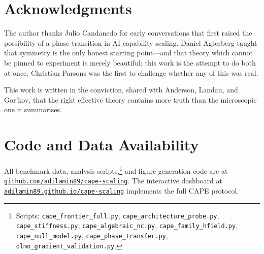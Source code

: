 \documentclass[11pt]{article}
\begin{document}
\section*{Acknowledgments}

The author thanks Julio Candanedo for early conversations that first raised the possibility of a phase transition in AI capability scaling.
Daniel Agterberg taught that symmetry is the only honest starting point---and that theory which cannot be pinned to experiment is merely beautiful; this work is the attempt to do both at once.
Christian Parsons was the first to challenge whether any of this was real.

This work is written in the conviction, shared with Anderson, Landau, and Gor'kov, that the right effective theory contains more truth than the microscopic one it summarises.

\section*{Code and Data Availability}

All benchmark data, analysis scripts,\footnote{Scripts: \texttt{cape\_frontier\_full.py}, \texttt{cape\_architecture\_probe.py}, \texttt{cape\_stiffness.py}, \texttt{cape\_algebraic\_nc.py}, \texttt{cape\_family\_hfield.py}, \texttt{cape\_null\_model.py}, \texttt{cape\_phase\_transfer.py}, \texttt{olmo\_gradient\_validation.py}.} and figure-generation code are at \href{https://github.com/adilamin89/cape-scaling}{\texttt{github.com/adilamin89/cape-scaling}}.
The interactive dashboard at \href{https://adilamin89.github.io/cape-scaling}{\texttt{adilamin89.github.io/cape-scaling}} implements the full CAPE protocol.
\end{document}
